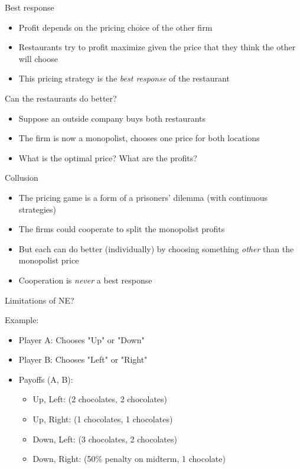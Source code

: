\documentclass[10pt]{beamer}
\begin{document}
\begin{frame}[label={sec:org8b7b291}]{}
\alert{Best response}
\begin{itemize}
\item Profit depends on the pricing choice of the other firm
\item Restaurants try to profit maximize given the price that they think the other will choose
\item This pricing strategy is the \emph{best response} of the restaurant
\end{itemize}
\end{frame}

\begin{frame}[label={sec:orge227bb5}]{}
\alert{Can the restaurants do better?}
\begin{itemize}
\item Suppose an outside company buys both restaurants
\item The firm is now a monopolist, chooses one price for both locations
\item What is the optimal price? What are the profits?
\end{itemize}
\end{frame}

\begin{frame}[label={sec:org200e6be}]{}
\alert{Collusion}
\begin{itemize}
\item The pricing game is a form of a prisoners' dilemma (with continuous strategies)
\item The firms could cooperate to split the monopolist profits
\item But each can do better (individually) by choosing something \emph{other} than the monopolist price
\item Cooperation is \emph{never} a best response
\end{itemize}
\end{frame}

\begin{frame}[label={sec:org9d95879}]{}
\alert{Limitations of NE?}

Example:
\begin{itemize}
\item Player A: Chooses "Up" or "Down"
\item Player B: Chooses "Left" or "Right"
\item Payoffs (A, B):
\begin{itemize}
\item Up, Left: (2 chocolates, 2 chocolates)
\item Up, Right: (1 chocolates, 1 chocolates)
\item Down, Left: (3 chocolates, 2 chocolates)
\item Down, Right: (50\% penalty on midterm, 1 chocolate)
\end{itemize}
\end{itemize}
\end{frame}
\end{document}
